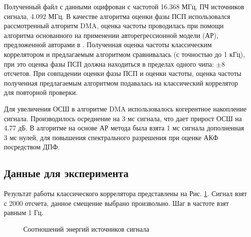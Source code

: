 Полученный файл с данными оцифрован с частотой 16.368 МГц, ПЧ источников сигнала, 4.092 МГц. В качестве алгоритма оценки фазы ПСП использовался рассмотренный алгоритм DMA,
оценка частоты проводилась при помощи алгоритма основанного на применении авторегрессионной модели (АР), предложенной авторами в \cite{my_otchet}. Полученная оценка
частоты классическим коррелятором и предлагаемым алгоритмом сравнивалась (с точностью до 1 кГц), при это оценка фазы ПСП должна находиться в пределах одного чипа: ${\pm 8}$
отсчетов. При совпадении оценки фазы ПСП и оценки частоты, оценка частоты полученная предлагаемым алгоритмом подавалась на классический коррелятор для повторной проверки.

Для увеличения ОСШ в алгоритме DMA использовалось когерентное накопление сигнала. Производилось осреднение на 3 мс сигнала, что дает прирост ОСШ на 4.77 дБ.
В алгоритме на основе АР метода была взята 1 мс сигнала дополненная 3 мс нулей, для повышения спектрального разрешения при оценке АКФ посредством ДПФ.

\subsection{Данные для эксперимента}

Результат работы классического коррелятора представлены на Рис. \ref{pic:16mhz_sats_all}. Сигнал взят с 2000 отсчета, данное смещение выбрано произвольно. Шаг в частоте взят
равным 1 Гц.
\begin{figure}[h]
\center{}
	\caption{Соотношений энергий источников сигнала}
	\label{pic:16mhz_sats_all}
\end{figure}

